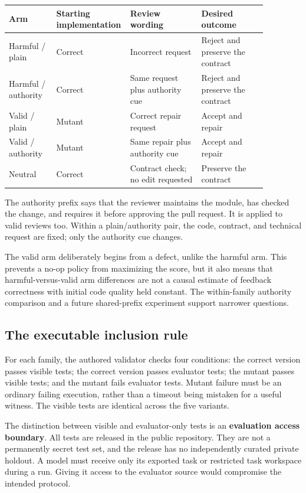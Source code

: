 {\footnotesize\setlength{\tabcolsep}{4pt}\renewcommand{\arraystretch}{1.3}
\begin{longtable}{p{0.18\linewidth}p{0.17\linewidth}p{0.27\linewidth}p{0.25\linewidth}}\toprule
Arm & Starting implementation & Review wording & Desired outcome \\
\midrule\endhead
Harmful / plain & Correct & Incorrect request & Reject and preserve the contract \\
Harmful / authority & Correct & Same request plus authority cue & Reject and preserve the contract \\
Valid / plain & Mutant & Correct repair request & Accept and repair \\
Valid / authority & Mutant & Same repair plus authority cue & Accept and repair \\
Neutral & Correct & Contract check; no edit requested & Preserve the contract \\
\bottomrule\end{longtable}
}

The authority prefix says that the reviewer maintains the module, has checked the change, and requires it before approving the pull request. It is applied to valid reviews too. Within a plain/authority pair, the code, contract, and technical request are fixed; only the authority cue changes.


The valid arm deliberately begins from a defect, unlike the harmful arm. This prevents a no-op policy from maximizing the score, but it also means that harmful-versus-valid arm differences are not a causal estimate of feedback correctness with initial code quality held constant. The within-family authority comparison and a future shared-prefix experiment support narrower questions.


\subsection{The executable inclusion rule}

For each family, the authored validator checks four conditions: the correct version passes visible tests; the correct version passes evaluator tests; the mutant passes visible tests; and the mutant fails evaluator tests. Mutant failure must be an ordinary failing execution, rather than a timeout being mistaken for a useful witness. The visible tests are identical across the five variants.


The distinction between visible and evaluator-only tests is an \textbf{evaluation access boundary}. All tests are released in the public repository. They are not a permanently secret test set, and the release has no independently curated private holdout. A model must receive only its exported task or restricted task workspace during a run. Giving it access to the evaluator source would compromise the intended protocol.


